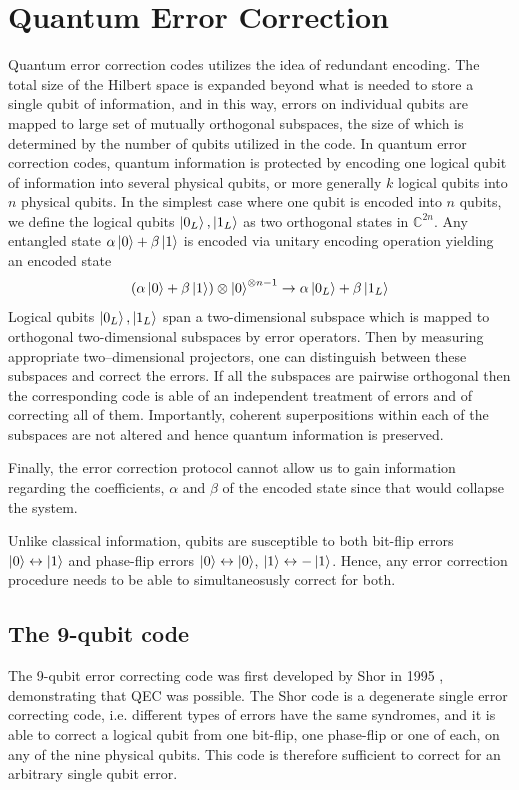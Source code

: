 \documentclass[10pt,a4paper]{book}
\numberwithin{equation}{chapter}
\numberwithin{figure}{chapter}
\numberwithin{table}{chapter}
\begin{document}
\section{Quantum Error Correction}
Quantum error correction codes utilizes the idea of redundant encoding. The total size of the Hilbert space is expanded beyond what is needed to store a single qubit of information, and in this way, errors on individual qubits are mapped to large set of mutually orthogonal subspaces, the size of which is determined by the number of qubits utilized in the code. In quantum error correction codes, quantum information is protected by encoding one logical qubit of information into several physical qubits, or more generally $k$ logical qubits into $n$ physical qubits. In the simplest case where one qubit is encoded into $n$ qubits, we define the logical qubits $\ket{0_L},\ket{1_L}$ as two orthogonal states in $\mathbb{C}^{2n}$. Any entangled state $\alpha \ket{0}+\beta \ket{1}$ is encoded via unitary encoding operation yielding an encoded state
\begin{equation}
(\alpha \ket{0}+\beta \ket{1})\otimes \ket{0}^{\otimes n-1} \rightarrow \alpha \ket{0_L}+\beta \ket{1_L}
\end{equation}
Logical qubits $\ket{0_L},\ket{1_L}$ span a two-dimensional subspace which is mapped to orthogonal two-dimensional subspaces by error operators. Then by measuring appropriate two–dimensional projectors, one can distinguish between these subspaces and correct the errors. If all the subspaces are pairwise orthogonal then the corresponding code is able of an independent treatment of errors and of correcting all of them. Importantly, coherent superpositions within each of the subspaces are not altered and hence quantum information is preserved. 

Finally, the error correction protocol cannot allow us to gain information regarding the coefficients, $\alpha$ and $\beta$ of the encoded state since that would collapse the system.

Unlike classical information, qubits are susceptible to both bit-flip errors $\ket{0}\leftrightarrow \ket{1}$ and phase-flip errors $\ket{0}\leftrightarrow \ket{0}$, $\ket{1}\leftrightarrow -\ket{1}$. Hence, any error correction procedure needs to be able to simultaneosusly correct for both. 

\subsection{The 9-qubit code}
The 9-qubit error correcting code was first developed by Shor in 1995 \cite{shor}, demonstrating that QEC was possible. The Shor code is a degenerate single error correcting code, i.e. different types of errors have the same syndromes, and it is able to correct a logical qubit from one bit-flip, one phase-flip or one of each, on any of the nine physical qubits. This code is therefore sufficient to correct for an arbitrary single qubit error.
\end{document}
